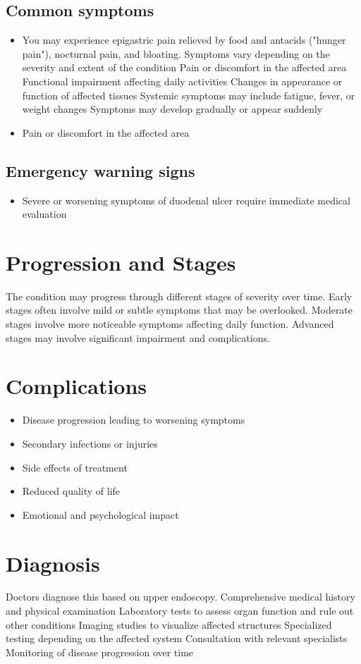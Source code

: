 \subsection{Common symptoms}
\begin{itemize}[noitemsep]
  \item You may experience epigastric pain relieved by food and antacids ("hunger pain"), nocturnal pain, and bloating. Symptoms vary depending on the severity and extent of the condition Pain or discomfort in the affected area Functional impairment affecting daily activities Changes in appearance or function of affected tissues Systemic symptoms may include fatigue, fever, or weight changes Symptoms may develop gradually or appear suddenly
  \item Pain or discomfort in the affected area
  \end{itemize}

\subsection{Emergency warning signs}
\begin{itemize}[noitemsep]
  \item Severe or worsening symptoms of duodenal ulcer require immediate medical evaluation
\end{itemize}
\section{Progression and Stages}
The condition may progress through different stages of severity over time. Early stages often involve mild or subtle symptoms that may be overlooked. Moderate stages involve more noticeable symptoms affecting daily function. Advanced stages may involve significant impairment and complications.
\section{Complications}
\begin{itemize}[noitemsep]
  \item Disease progression leading to worsening symptoms
  \item Secondary infections or injuries
  \item Side effects of treatment
  \item Reduced quality of life
  \item Emotional and psychological impact
\end{itemize}
\section{Diagnosis}
Doctors diagnose this based on upper endoscopy. Comprehensive medical history and physical examination Laboratory tests to assess organ function and rule out other conditions Imaging studies to visualize affected structures Specialized testing depending on the affected system Consultation with relevant specialists Monitoring of disease progression over time

